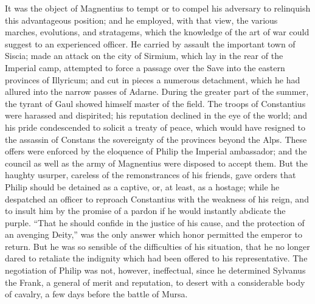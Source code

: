 It was the object of Magnentius to tempt or to compel his
adversary to relinquish this advantageous position; and he
employed, with that view, the various marches, evolutions, and
stratagems, which the knowledge of the art of war could suggest
to an experienced officer. He carried by assault the important
town of Siscia; made an attack on the city of Sirmium, which lay
in the rear of the Imperial camp, attempted to force a passage
over the Save into the eastern provinces of Illyricum; and cut in
pieces a numerous detachment, which he had allured into the
narrow passes of Adarne. During the greater part of the summer,
the tyrant of Gaul showed himself master of the field. The troops
of Constantius were harassed and dispirited; his reputation
declined in the eye of the world; and his pride condescended to
solicit a treaty of peace, which would have resigned to the
assassin of Constans the sovereignty of the provinces beyond the
Alps. These offers were enforced by the eloquence of Philip the
Imperial ambassador; and the council as well as the army of
Magnentius were disposed to accept them. But the haughty usurper,
careless of the remonstrances of his friends, gave orders that
Philip should be detained as a captive, or, at least, as a
hostage; while he despatched an officer to reproach Constantius
with the weakness of his reign, and to insult him by the promise
of a pardon if he would instantly abdicate the purple. “That he
should confide in the justice of his cause, and the protection of
an avenging Deity,” was the only answer which honor permitted the
emperor to return. But he was so sensible of the difficulties of
his situation, that he no longer dared to retaliate the indignity
which had been offered to his representative. The negotiation of
Philip was not, however, ineffectual, since he determined
Sylvanus the Frank, a general of merit and reputation, to desert
with a considerable body of cavalry, a few days before the battle
of Mursa.



